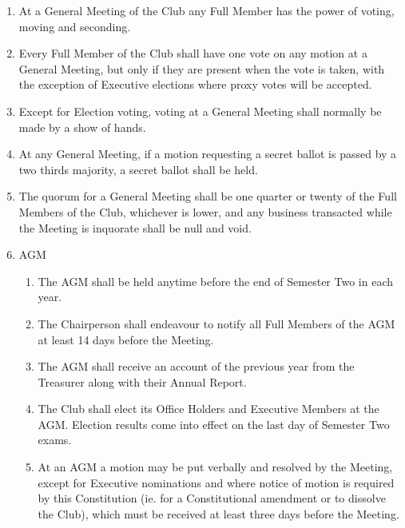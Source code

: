 \documentclass[a4paper]{article}
\begin{document}
	\begin{enumerate}
		\item At a General Meeting of the Club any Full Member has the power of voting, moving and seconding.
		
		\item Every Full Member of the Club shall have one vote on any motion at a General Meeting, but only if they are present when the vote is taken, with the exception of Executive elections where proxy votes will be accepted.
		
		\item Except for Election voting, voting at a General Meeting shall normally be made by a show of hands.
		
		\item At any General Meeting, if a motion requesting a secret ballot is passed by a two thirds majority, a secret ballot shall be held.
		
		\item The quorum for a General Meeting shall be one quarter or twenty of the Full Members of the Club, whichever is lower, and any business transacted while the Meeting is inquorate shall be null and void.
		
		\item \acf{AGM}
		\begin{enumerate}
			\item The \ac{AGM} shall be held anytime before the end of Semester Two in each year.
			
			\item The Chairperson shall endeavour to notify all Full Members of the \ac{AGM} at least 14 days before the Meeting.
			
			\item The \ac{AGM} shall receive an account of the previous year from the Treasurer along with their Annual Report.
			
			\item The Club shall elect its Office Holders and Executive Members at the \ac{AGM}. Election results come into effect on the last day of Semester Two exams.
			
			\item At an \ac{AGM} a motion may be put verbally and resolved by the Meeting, except for Executive nominations and where notice of motion is required by this Constitution (ie. for a Constitutional amendment or to dissolve the Club), which must be received at least three days before the Meeting.
		\end{enumerate}
	

\end{enumerate}
\end{document}
